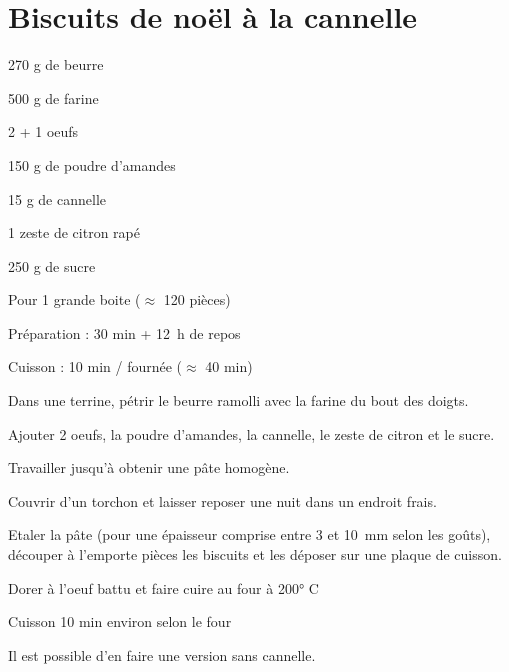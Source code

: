\section[\normalsize{Biscuits de noël à la cannelle}]{Biscuits de noël à la cannelle}

\begin{ingredients}
\item 270 g de beurre
\item 500 g de farine
\item 2 + 1 oeufs
\item 150 g de poudre d'amandes
\item 15 g de cannelle
\item 1 zeste de citron rap\'e
\item 250 g de sucre 
\end{ingredients}
\begin{infos}
\item Pour 1 grande boite ($\approx$ 120 pièces)
\item Préparation : 30 min + 12~h de repos
\item Cuisson : 10 min / fournée  ($\approx$ 40 min)
\end{infos}
\begin{etapes}
\item Dans une terrine, p\'etrir le beurre ramolli avec la farine du bout des doigts. 
\item Ajouter 2 oeufs, la poudre d'amandes, la cannelle, le zeste de citron et le sucre. 
\item Travailler jusqu'\`a obtenir une p\^ate homog\`ene. 
\item Couvrir d'un torchon et laisser reposer une nuit dans un endroit frais.
\item Etaler la p\^ate (pour une épaisseur comprise entre 3 et 10~mm selon les goûts), d\'ecouper \`a l'emporte pi\`eces les biscuits et les d\'eposer sur une plaque de cuisson. 
\item Dorer \`a l'oeuf battu et faire cuire au four \`a 200° C
\item Cuisson 10 min environ selon le four
\end{etapes}
\begin{conseils}
Il est possible d'en faire une version sans cannelle.
\end{conseils}
